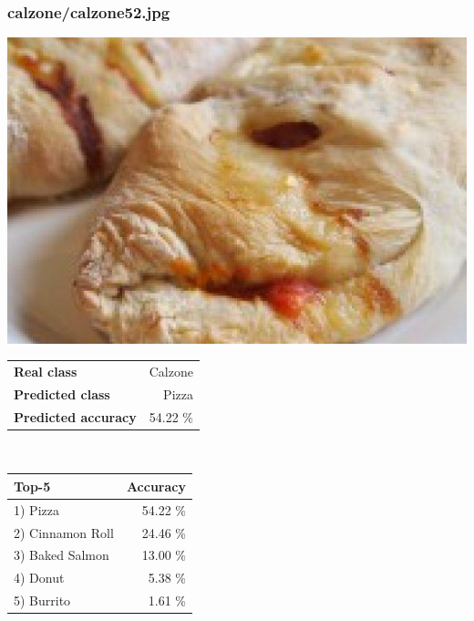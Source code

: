 \subsubsection{calzone/calzone52.jpg}

\begin{minipage}[t]{0.4\textwidth}
	\vspace{0pt}
	\includegraphics[width=\linewidth]{images/evaluation-images/calzone/calzone52.jpg}
\end{minipage}
\hfill
\begin{minipage}[t]{0.5\textwidth}
	\vspace{0pt}\raggedright
	\begin{tabularx}{\textwidth}{X r}
		\small \textbf{Real class} & \small Calzone\\
		\small \textbf{Predicted class} & \small Pizza\\
		\small \textbf{Predicted accuracy} & \small 54.22 \%
    \end{tabularx}\\
    
    \vspace{6pt}
	\begin{tabularx}{\textwidth}{X r}
        \small \textbf{Top-5} & \small \textbf{Accuracy} \\
        \hline
		\small 1) Pizza & \small 54.22 \%\\\small 2) Cinnamon Roll & \small 24.46 \%\\\small 3) Baked Salmon & \small 13.00 \%\\\small 4) Donut & \small 5.38 \%\\\small 5) Burrito & \small 1.61 \%
    \end{tabularx}
\end{minipage}
    
